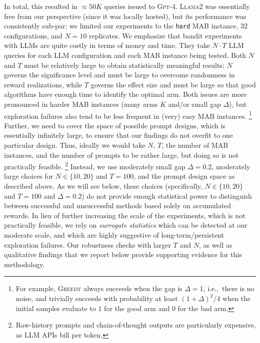 \documentclass[11pt]{article}
\newcommand{\gptfour}{\textsc{Gpt-4}\xspace}
\newcommand{\llama}{\textsc{Llama2}\xspace}
\newcommand{\greedy}{\textsc{Greedy}\xspace}
\newcommand{\hard}{\texttt{hard}\xspace}
\newcommand{\ie}{{i.e.,~\xspace}}
\begin{document}
In total, this resulted in ${\approx}50K$ queries issued to \gptfour.
\llama was essentially free from our perspective (since it was locally hosted), but its performance was consistently sub-par; we limited our experiments to the \hard MAB instance, $32$ configurations, and $N=10$ replicates.
We emphasize that bandit experiments with LLMs are quite costly in terms of money and time. They take $N \cdot T$ LLM queries for each LLM configuration and each MAB instance being tested.
Both $N$ and $T$ must be relatively large to obtain statistically meaningful results:
$N$ governs the significance level and must be large to overcome randomness in reward realizations, while $T$ governs the effect size and must be large so that good algorithms have enough time to identify the optimal arm.
Both issues are more pronounced in harder MAB instances (many arms $K$ and/or small gap $\Delta$), but exploration failures also tend to be less frequent in (very) easy MAB instances.
\footnote{For example, \greedy always succeeds when the gap is $\Delta=1$, \ie there is no noise, and trivially succeeds with probability at least $(1+\Delta)^2/4$ when the initial samples evaluate to $1$ for the good arm and $0$ for the bad arm.}
Further, we need to cover the space of possible prompt designs, which is essentially infinitely large, to ensure that our findings do not overfit to one particular design.
Thus, ideally we would take $N$, $T$, the number of MAB instances, and the number of prompts to be rather large, but doing so is not practically feasible.
\footnote{Raw-history prompts and chain-of-thought outputs are particularly expensive, as LLM APIs bill per token.}
Instead, we use
moderately small gap $\Delta=0.2$, moderately large choices for $N \in \{10,20\}$ and $T=100$, and the prompt design space as described above.
As we will see below, these choices (specifically, $N \in \{10,20\}$
and $T=100$ and $\Delta=0.2$) do not provide enough statistical power
to distinguish between successful and unsuccessful methods based
solely on accumulated rewards. In lieu of further increasing the scale
of the experiments, which is not practically feasible, we rely
on \emph{surrogate statistics} which can be detected at our moderate
scale, and which are highly suggestive of long-term/persistent
exploration failures. Our robustness checks with larger $T$ and $N$, as well as qualitative findings that we report below provide supporting evidence for this methodology.
\end{document}
